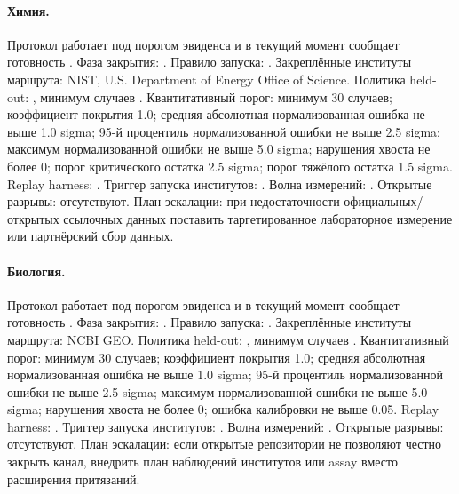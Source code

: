 \paragraph{Химия.}
Протокол  работает под порогом эвиденса  и в текущий момент сообщает готовность .
Фаза закрытия: . Правило запуска: .
Закреплённые институты маршрута: NIST, \allowbreak U.S. Department of Energy Office of Science.
Политика held-out: , минимум случаев .
Квантитативный порог: минимум 30 случаев; коэффициент покрытия 1.0; средняя абсолютная нормализованная ошибка не выше 1.0 sigma; 95-й процентиль нормализованной ошибки не выше 2.5 sigma; максимум нормализованной ошибки не выше 5.0 sigma; нарушения хвоста не более 0; порог критического остатка 2.5 sigma; порог тяжёлого остатка 1.5 sigma.
Replay harness: .
Триггер запуска институтов: . Волна измерений: .
Открытые разрывы: отсутствуют.
План эскалации: при недостаточности официальных/открытых ссылочных данных поставить таргетированное лабораторное измерение или партнёрский сбор данных.

\paragraph{Биология.}
Протокол  работает под порогом эвиденса  и в текущий момент сообщает готовность .
Фаза закрытия: . Правило запуска: .
Закреплённые институты маршрута: NCBI GEO.
Политика held-out: , минимум случаев .
Квантитативный порог: минимум 30 случаев; коэффициент покрытия 1.0; средняя абсолютная нормализованная ошибка не выше 1.0 sigma; 95-й процентиль нормализованной ошибки не выше 2.5 sigma; максимум нормализованной ошибки не выше 5.0 sigma; нарушения хвоста не более 0; ошибка калибровки не выше 0.05.
Replay harness: .
Триггер запуска институтов: . Волна измерений: .
Открытые разрывы: отсутствуют.
План эскалации: если открытые репозитории не позволяют честно закрыть канал, внедрить план наблюдений институтов или assay вместо расширения притязаний.

